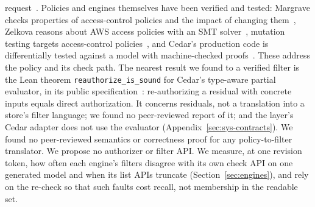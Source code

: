 request~\cite{oasis2013extensible}. Policies and engines themselves have been verified and tested:
Margrave checks properties of access-control policies and the impact of changing
them~\cite{fisler2005verification}, Zelkova reasons about AWS access policies with an SMT
solver~\cite{backes2018semanticbased}, mutation testing targets access-control
policies~\cite{martin2007fault}, and Cedar's production code is differentially tested against a model
with machine-checked proofs~\cite{disselkoen2024how}. These address the policy and its check path. The nearest result we found to a verified filter is the Lean theorem \texttt{reauthorize\_is\_sound} for Cedar's type-aware partial evaluator, in its public specification~\cite{cedar2026cedarspec}: re-authorizing a residual with concrete inputs equals direct authorization. It concerns residuals, not a translation into a store's filter language; we found no peer-reviewed report of it; and the layer's Cedar adapter does not use the evaluator (Appendix~\ref{sec:sys-contracts}). We
found no peer-reviewed semantics or correctness proof for any policy-to-filter translator. We propose
no authorizer or filter API. We measure, at one revision
token, how often each engine's filters disagree with its own check API on one generated model and when its list APIs
truncate (Section~\ref{sec:engines}), and rely on the re-check so that such faults cost recall, not
membership in the readable set.

